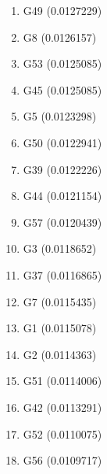 \begin{enumerate}
\item G49 (0.0127229)
\item G8 (0.0126157)
\item G53 (0.0125085)
\item G45 (0.0125085)
\item G5 (0.0123298)
\item G50 (0.0122941)
\item G39 (0.0122226)
\item G44 (0.0121154)
\item G57 (0.0120439)
\item G3 (0.0118652)
\item G37 (0.0116865)
\item G7 (0.0115435)
\item G1 (0.0115078)
\item G2 (0.0114363)
\item G51 (0.0114006)
\item G42 (0.0113291)
\item G52 (0.0110075)
\item G56 (0.0109717)
\end{enumerate}